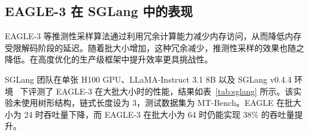 \documentclass[11pt]{article}
\begin{document}
\begin{table}[h]
  \centering
  \caption{以 LLaMA-Instruct 3.1 8B 为目标模型的消融实验结果。"去除特征约束"对应 EAGLE-3 的第一项改进，即去除特征预测约束；"融合特征"对应第二项改进，即以低层、中层和高层特征融合取代顶层特征。}
  \vspace{-0.2cm}
  \label{tab:aba}%
  \vspace{-0.3cm}
\end{table}%

\subsection{EAGLE-3 在 SGLang 中的表现}

EAGLE-3 等推测性采样算法通过利用冗余计算能力减少内存访问，从而降低内存受限解码阶段的延迟。随着批大小增加，这种冗余减少，推测性采样的效果也随之降低。在高度优化的生产级框架中提升效率更具挑战性。

SGLang 团队在单张 H100 GPU、LLaMA-Instruct 3.1 8B 以及 SGLang v0.4.4 环境~\cite{zheng2024sglang} 下评测了 EAGLE-3 在大批大小时的性能，结果如表~\ref{tab:sglang} 所示。该实验未使用树形结构，链式长度设为 3，测试数据集为 MT-Bench。EAGLE 在批大小为 24 时吞吐量下降，而 EAGLE-3 在批大小为 64 时仍能实现 38\% 的吞吐量提升。

\begin{table}[h]
  \centering
  \caption{在 H100 和 LLaMA-Instruct 3.1 8B 上 MT-Bench 数据集不同批大小下的吞吐量提升，以不使用推测性采样的 SGLang 为基线（1.00x）。实验由 SGLang 团队进行。}
  \label{tab:sglang}%
\end{table}%
\end{document}
